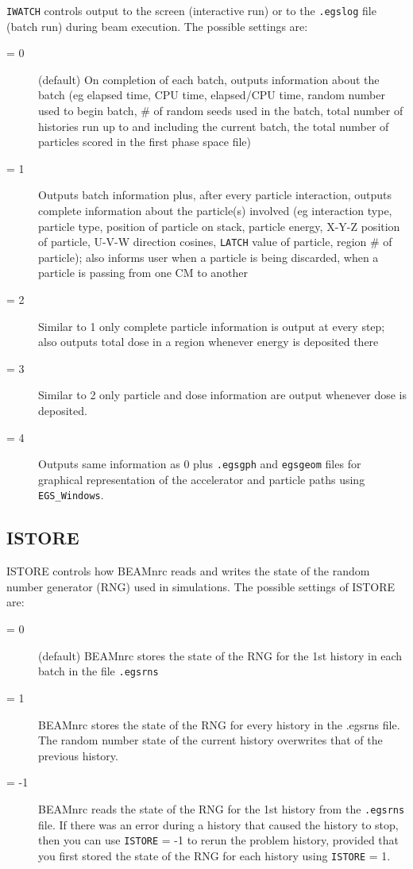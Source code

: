 \documentclass[12pt,twoside]{article}
\begin{document}
\verb+IWATCH+ controls output to the screen (interactive run) or to the
\verb+.egslog+ file (batch run) during beam execution.  The possible settings
are:
\begin{description}
\item [= 0] (default) On completion of each batch, outputs information about the
batch (eg elapsed time, CPU time, elapsed/CPU time, random number used
to begin batch, \# of random seeds used in the batch, total number of
histories run up to and including the current batch, the total number of
particles scored in the first phase space file)

\item [= 1] Outputs batch information plus, after every particle
interaction, outputs complete information about the particle(s)
involved (eg interaction type, particle type, position of particle on
stack, particle energy, X-Y-Z position of particle, U-V-W direction
cosines, \verb+LATCH+ value of particle, region \# of particle); also informs
user when a particle is being discarded, when a particle is passing from
one CM to another

\item [= 2] Similar to 1 only complete particle information is output at
every step; also outputs total dose in a region whenever energy is
deposited there

\item [= 3] Similar to 2 only particle and dose information are output
whenever dose is deposited.

\item [= 4] Outputs same information as 0 plus \verb+.egsgph+ and
\verb+egsgeom+
files for graphical representation of the accelerator and particle paths
using \verb+EGS_Windows+\cite{TR99a}.
\end{description}

\subsection{ISTORE}

ISTORE controls how BEAMnrc reads and writes the state of the random number
generator (RNG) used in simulations.  The possible
settings of ISTORE are:
\begin{description}
\item [= 0] (default) BEAMnrc stores the state of the RNG for the 1st
history in each batch in the file \verb+.egsrns+
\item [= 1] BEAMnrc stores the state of the RNG for every history in the
.egsrns file.  The random number state of the current history overwrites
that of the previous history.
\item [= -1] BEAMnrc reads the state of the RNG for the 1st history
from the \verb+.egsrns+ file.  If there was an error during
a history that caused the history to stop, then you can use {\tt ISTORE} = -1
to rerun the problem history, provided that you first stored the state
of the RNG for each history using {\tt ISTORE} = 1.
\end{description}
\end{document}

